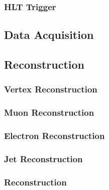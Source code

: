 \subsubsection{HLT Trigger}
\subsection{Data Acquisition}
\subsection{Reconstruction}
\subsubsection{Vertex Reconstruction}
\subsubsection{Muon Reconstruction}
\subsubsection{Electron Reconstruction}
\subsubsection{Jet Reconstruction}
\subsubsection{\met Reconstruction}
